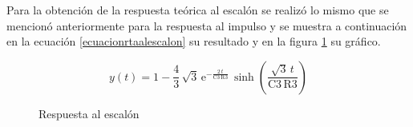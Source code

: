 \documentclass[12pt,a4paper]{article}
\begin{document}








Para la obtención de la respuesta teórica al escalón se realizó lo mismo que se mencionó anteriormente para la respuesta al impulso y se muestra a continuación en la ecuación \ref{ecuacionrtaalescalon} su resultado y en la figura \ref{respuestaalescalon} su gráfico.

\begin{equation}
y \! \left(t\right) = 1 - \dfrac{4}{3}\, \sqrt{3}\, \mathrm{e}^{-\frac{2\, t}{\mathrm{C3}\, \mathrm{R3}}}\, \sinh\!\left(\dfrac{\sqrt{3}\, t}{\mathrm{C3}\, \mathrm{R3}}\right)
\label{ecuacionrtaalescalon}
\end{equation}

\begin{figure}[H] 
\begin{center}
\caption{Respuesta al escalón}
\label{respuestaalescalon}
\end{center}
\end{figure}
\end{document}
